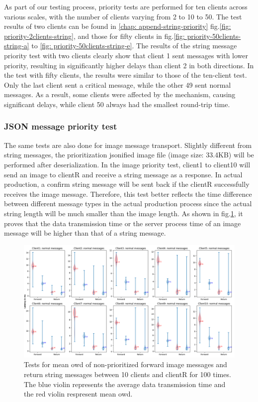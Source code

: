 As part of our testing process, priority tests are performed for ten clients across 
various scales, with the number of clients varying from 2 to 10 to 50. The test results 
of two clients can be found in \ref{chap: append-string-priority} fig.\ref{fig: priority-2clients-string}, 
and those for fifty clients in fig.\ref{fig: priority-50clients-string-a} to 
\ref{fig: priority-50clients-string-e}.  The results of the string message priority 
test with two clients clearly show that client 1 sent messages with lower priority, 
resulting in significantly higher delays than client 2 in both directions. In the test 
with fifty clients, the results were similar to those of the ten-client test. Only the 
last client sent a critical message, while the other 49 sent normal messages. As a 
result, some clients were affected by the mechanism, causing significant delays, while 
client 50 always had the smallest round-trip time.

\subsubsection{JSON message priority test}
The same tests are also done for image message transport. Slightly different from string 
messages, the prioritization jsonified image file (image size: 33.4KB) will be performed 
after deserialization. In the image priority test, client1 to client10 will send an image 
to clientR and receive a string message as a response. In actual production, a confirm 
string message will be sent back if the clientR successfully receives the image message. 
Therefore, this test better reflects the time difference between different message types 
in the actual production process since the actual string length will be much smaller than 
the image length. As shown in fig.\ref{fig: priority-10clients-c}, it proves that the data 
transmission time or the server process time of an image message 
will be higher than that of a string message.


\begin{figure}
    \centering
    \includegraphics[width=\textheight]{figures/tests/priority_tests/violin_10clients_image_non_priority.png}\hfill 
    \caption{Tests for mean \gls{owd} of non-prioritized forward image messages and return string messages between 10 clients 
    and clientR for 100 times. The blue violin represents the average data transmission time and the red violin 
    respresent mean \gls{owd}.} \label{fig: priority-10clients-c}
\end{figure}


